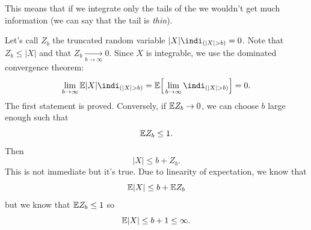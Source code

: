 \documentclass{report}
\begin{document}
This means that if we integrate only the tails of the \rv{} we wouldn't get much information (we can say that the tail is \textit{thin}).
\begin{fancyproof}
	Let's call $Z_b$ the truncated random variable $|X|\indi_{(|X|>b)}=0$. Note that $Z_b\leq|X|$ and that $Z_b\xrightarrow[b\to\infty]{}0$. Since $X$ is integrable, we use the dominated convergence theorem:
	\[\lim_{b\to\infty}\ev|X|\indi_{(|X|>b)}=\ev\Big[\lim_{b\to\infty}\indi_{(|X|>b)}\Big]=0.\]
	The first statement is proved. Conversely, if $\mathbb{E} Z_b\to0$, we can choose $b$ large enough such that
	\[\mathbb{E} Z_b\leq 1.\]
	Then 
	\[|X|\leq b+Z_b.\]
	This is not immediate but it's true. Due to linearity of expectation, we know that
	\[\mathbb{E}|X|\leq b+\mathbb{E} Z_b\]
	but we know that $\mathbb{E} Z_b\leq 1$ so
	\[\mathbb{E}|X|\leq b+1\leq\infty.\]
\end{fancyproof}
\end{document}
